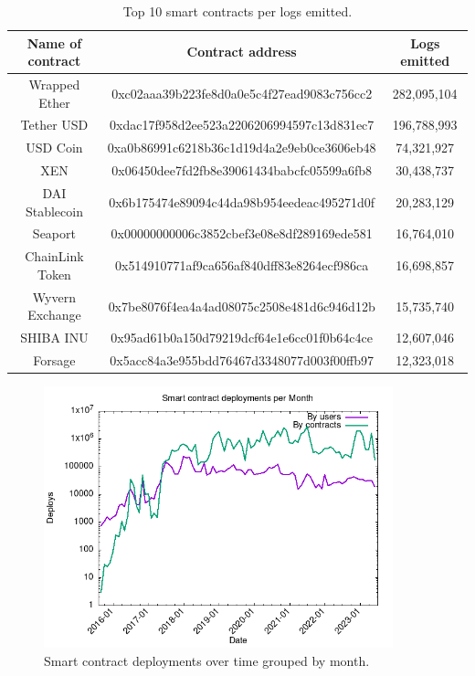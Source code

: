\begin{table}[H]
\centering
    \begin{threeparttable}
    \begin{tabular}{ c c c } 
    \toprule
    \textbf{Name of contract} & \textbf{Contract address} & \textbf{Logs emitted} \\
    \midrule
       Wrapped Ether & \small{0xc02aaa39b223fe8d0a0e5c4f27ead9083c756cc2} & 282,095,104  \\ [1.2ex]
       Tether USD  & \small{0xdac17f958d2ee523a2206206994597c13d831ec7} & 196,788,993  \\ [1.2ex]
       USD Coin & \small{0xa0b86991c6218b36c1d19d4a2e9eb0ce3606eb48} & 74,321,927  \\ [1.2ex]
       XEN & \small{0x06450dee7fd2fb8e39061434babcfc05599a6fb8} & 30,438,737  \\ [1.2ex]
       DAI Stablecoin& \small{0x6b175474e89094c44da98b954eedeac495271d0f} & 20,283,129  \\ [1.2ex]
       Seaport & \small{0x00000000006c3852cbef3e08e8df289169ede581} & 16,764,010  \\ [1.2ex]
       ChainLink Token & \small{0x514910771af9ca656af840dff83e8264ecf986ca} & 16,698,857  \\ [1.2ex]
       Wyvern Exchange & \small{0x7be8076f4ea4a4ad08075c2508e481d6c946d12b} & 15,735,740  \\ [1.2ex]
       SHIBA INU & \small{0x95ad61b0a150d79219dcf64e1e6cc01f0b64c4ce} & 12,607,046  \\ [1.2ex]
       Forsage & \small{0x5acc84a3e955bdd76467d3348077d003f00ffb97} & 12,323,018  \\ [1.2ex]  
    \bottomrule
    \end{tabular}
    \end{threeparttable}
    \caption{Top 10 smart contracts per logs emitted.}
    \label{table:top-logs-emitters}
\end{table}

\begin{figure}[H]
    \centering
    \includegraphics[width=0.9\textwidth]{Figures/analysis/deploys_per_month.png}
    \caption{Smart contract deployments over time grouped by month.}
    \label{fig:deploy-history}
\end{figure}

